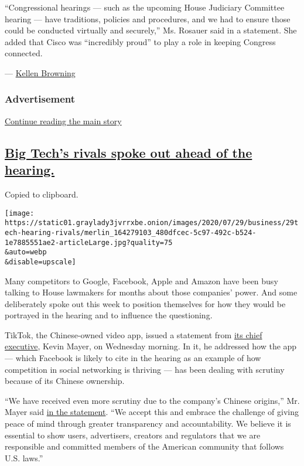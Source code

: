 ``Congressional hearings --- such as the upcoming House Judiciary
Committee hearing --- have traditions, policies and procedures, and we
had to ensure those could be conducted virtually and securely,'' Ms.
Rosauer said in a statement. She added that Cisco was ``incredibly
proud'' to play a role in keeping Congress connected.

--- \href{https://www.nytimes3xbfgragh.onion/by/kellen-browning}{Kellen
Browning}

\hypertarget{advertisement-1}{%
\subsubsection{Advertisement}\label{advertisement-1}}

\protect\hyperlink{after-dfp-ad-mid2}{Continue reading the main story}

\hypertarget{big-techs-rivals-spoke-out-ahead-of-the-hearing}{%
\subsection{\texorpdfstring{\protect\hyperlink{big-techs-rivals-spoke-out-ahead-of-the-hearing}{Big
Tech's rivals spoke out ahead of the
hearing.}}{Big Tech's rivals spoke out ahead of the hearing.}}\label{big-techs-rivals-spoke-out-ahead-of-the-hearing}}

Copied to clipboard.

\texttt{[image: https://static01.graylady3jvrrxbe.onion/images/2020/07/29/business/29tech-hearing-rivals/merlin\_164279103\_480dfcec-5c97-492c-b524-1e7885551ae2-articleLarge.jpg?quality=75\\\&auto=webp\\\&disable=upscale]}

Many competitors to Google, Facebook, Apple and Amazon have been busy
talking to House lawmakers for months about those companies' power. And
some deliberately spoke out this week to position themselves for how
they would be portrayed in the hearing and to influence the questioning.

TikTok, the Chinese-owned video app, issued a statement from
\href{https://www.nytimes3xbfgragh.onion/2020/05/18/business/media/tiktok-ceo-kevin-mayer.html}{its
chief executive}, Kevin Mayer, on Wednesday morning. In it, he addressed
how the app --- which Facebook is likely to cite in the hearing as an
example of how competition in social networking is thriving --- has been
dealing with scrutiny because of its Chinese ownership.

``We have received even more scrutiny due to the company's Chinese
origins,'' Mr. Mayer said
\href{https://newsroom.tiktok.com/en-us/fair-competition-and-transparency-benefits-us-all}{in
the statement}. ``We accept this and embrace the challenge of giving
peace of mind through greater transparency and accountability. We
believe it is essential to show users, advertisers, creators and
regulators that we are responsible and committed members of the American
community that follows U.S. laws.''

